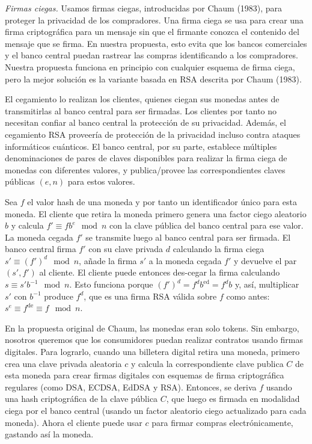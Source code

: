 \documentclass[10pt,spanish]{article}
\begin{document}
\emph{Firmas ciegas.} Usamos firmas ciegas, introducidas por Chaum
(1983), para proteger la privacidad de los compradores. Una firma ciega
se usa para crear una firma criptográfica para un mensaje sin que el
firmante conozca el contenido del mensaje que se firma. En nuestra
propuesta, esto evita que los bancos comerciales y el banco central
puedan rastrear las compras identificando a los compradores. Nuestra
propuesta funciona en principio con cualquier esquema de firma ciega,
pero la mejor solución es la variante basada en RSA descrita por Chaum
(1983).

El cegamiento lo realizan los clientes, quienes ciegan sus monedas antes
de transmitirlas al banco central para ser firmadas. Los clientes por
tanto no necesitan confiar al banco central la protección de su
privacidad. Además, el cegamiento RSA proveería de protección de la
privacidad incluso contra ataques informáticos cuánticos. El banco
central, por su parte, establece múltiples denominaciones de pares de
claves disponibles para realizar la firma ciega de monedas con
diferentes valores, y publica/provee las correspondientes claves
públicas $(e, n)$ para estos valores.

Sea $f$ el valor hash de una moneda y por tanto un identificador único
para esta moneda. El cliente que retira la moneda primero genera una
factor ciego aleatorio $b$ y calcula
$f' \equiv fb^{e} \mod n$
con la clave pública del banco central para ese valor.
La moneda cegada $f'$ se transmite luego
al banco central para ser firmada. El banco central firma $f'$ con su
clave privada $d$ calculando la firma ciega
$s' \equiv \left(f' \right)^{d} \mod n$,
añade la firma $s'$ a la moneda cegada $f'$ y devuelve el par
$(s',f')$ al cliente.
El cliente puede entonces des-cegar la firma calculando
$s \equiv s'b^{- 1} \mod n$.
Esto funciona porque
$\left( f' \right)^{d} = f^{d}b^{\text{ed}} = f^{d}b$ y, así,
multiplicar $s'$ con $b^{- 1}$ produce $f^{d}$, que es una firma RSA
válida sobre $f$ como antes:
$s^{e} \equiv f^{\text{de}} \equiv f \mod n$.

En la propuesta original de Chaum, las monedas eran solo tokens. Sin
embargo, nosotros queremos que los consumidores puedan realizar
contratos usando firmas digitales. Para lograrlo, cuando una billetera
digital retira una moneda, primero crea una clave privada aleatoria
$c$ y calcula la correspondiente clave publica $C$ de esta moneda
para crear firmas digitales con esquemas de firma criptográfica
regulares (como DSA, ECDSA, EdDSA y RSA). Entonces, se deriva $f$
usando una hash criptográfica de la clave pública $C$, que luego es
firmada en modalidad ciega por el banco central (usando un factor
aleatorio ciego actualizado para cada moneda). Ahora el cliente puede
usar $c$ para firmar compras electrónicamente, gastando así la moneda.
\end{document}
